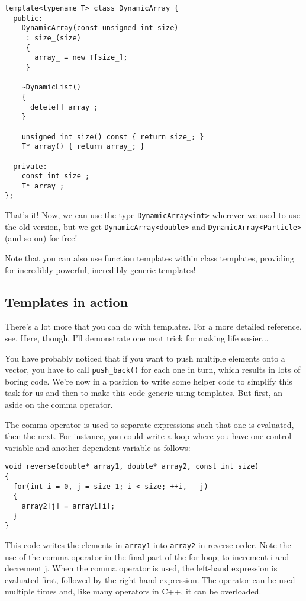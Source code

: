 \documentclass[a4paper]{scrartcl}
\begin{document}
\begin{verbatim}
template<typename T> class DynamicArray {
  public:
    DynamicArray(const unsigned int size)
     : size_(size)
     {
       array_ = new T[size_];
     }

    ~DynamicList()
    {
      delete[] array_;
    }
    
	unsigned int size() const { return size_; }
    T* array() { return array_; }

  private:
    const int size_;
    T* array_;
};
\end{verbatim}

That's it! Now, we can use the type \verb|DynamicArray<int>| wherever we used to use the old version, but we get \verb|DynamicArray<double>| and \verb|DynamicArray<Particle>| (and so on) for free! 

Note that you can also use function templates within class templates, providing for incredibly powerful, incredibly generic templates!

\subsection{Templates in action}
There's a lot more that you can do with templates. For a more detailed reference, see\cite{Templates}. Here, though, I'll demonstrate one neat trick for making life easier...

You have probably noticed that if you want to push multiple elements onto a vector, you have to call \verb|push_back()| for each one in turn, which results in lots of boring code. We're now in a position to write some helper code to simplify this task for us and then to make this code generic using templates. But first, an aside on the comma operator.

The comma operator is used to separate expressions such that one is evaluated, then the next. For instance, you could write a loop where you have one control variable and another dependent variable as follows:

\begin{verbatim}
void reverse(double* array1, double* array2, const int size)
{
  for(int i = 0, j = size-1; i < size; ++i, --j)
  {
    array2[j] = array1[i];
  }
}
\end{verbatim}

This code writes the elements in \verb|array1| into \verb|array2| in reverse order. Note the use of the comma operator in the final part of the for loop; to increment i and decrement j. When the comma operator is used, the left-hand expression is evaluated first, followed by the right-hand expression. The operator can be used multiple times and, like many operators in C++, it can be overloaded.
\end{document}
